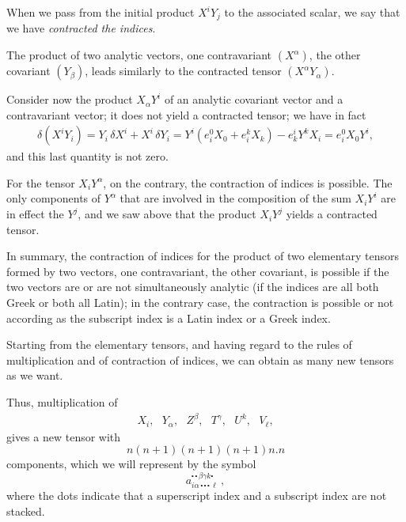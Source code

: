 When we pass from the initial product $X^iY_j$ to the associated scalar, we say that we have {\em contracted the indices}.

The product of two analytic vectors, one contravariant $(X^\alpha)$, the other covariant $(Y_\beta)$, leads similarly to the contracted tensor $(X^\alpha Y_\alpha)$.

Consider now the product $X_\alpha Y^i$ of an analytic covariant vector and a contravariant vector; it does not yield a contracted tensor; we have in fact
\begin{eqnarray*}
\delta(X^i Y_i) = Y_i\, \delta X^i + X^i\, \delta Y_i = Y^i ( e^0_i X_0 + e^k_i X_k ) - e^i_k Y^k X_i = e^0_i X_0 Y^i ,
\end{eqnarray*}
and this last quantity is not zero. 

For the tensor $X_i Y^\alpha$, on the contrary, the contraction of indices is possible. The only components of $Y^\alpha$ that are involved in the composition of the sum $X_i Y^i$ are in effect the $Y^j$, and we saw above that the product $X_iY^j$ yields a contracted tensor. 

In summary, the contraction of indices for the product of two elementary tensors formed by two vectors, one contravariant, the other covariant, is possible if the two vectors are or are not simultaneously analytic (if the indices are all both Greek or both all Latin); in the contrary case, the contraction is possible or not according as the subscript index is a Latin index or a Greek index.

Starting from the elementary tensors, and having regard to the rules of multiplication and of contraction of indices, we can obtain as many new tensors as we want. 

Thus, multiplication of
\begin{eqnarray*}
X_i, \ \ \ Y_\alpha, \ \ \ Z^\beta, \ \ \ T^\gamma, \ \ \ U^k, \ \ \ V_\ell, 
\end{eqnarray*}
gives a new tensor with 
 $$ n(n+1)(n+1)(n+1)n.n $$
components, which we will represent by the symbol
$$  a^{\centerdot \, \centerdot \, \beta \gamma k \centerdot }_{i \alpha\, \centerdot \, \centerdot \, \centerdot \, \ell}\, , $$
where the dots indicate that a superscript index and a subscript  index are not stacked.

